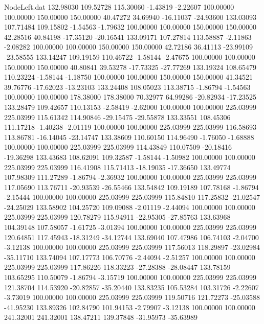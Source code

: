 \begin{filecontents}{NodeLeft.dat}
 132.98030  109.52728  115.30060    -1.43819   -2.22607  100.00000  100.00000  150.00000  150.00000   40.47272   34.69940  -16.11037  -24.93600
 133.03093  107.71484  109.15802    -1.54563   -1.79632  100.00000  100.00000  150.00000  150.00000   42.28516   40.84198  -17.35120  -20.16541
 133.09171  107.27814  113.58887    -2.11863   -2.08282  100.00000  100.00000  150.00000  150.00000   42.72186   36.41113  -23.99109  -23.58555
 133.14247  109.19159  110.46722    -1.58144   -2.47675  100.00000  100.00000  150.00000  150.00000   40.80841   39.53278  -17.73325  -27.77269
 133.19324  108.65479  110.23224    -1.58144   -1.18750  100.00000  100.00000  150.00000  150.00000   41.34521   39.76776  -17.62023  -13.23103
 133.24408  108.05023  113.38715    -1.86794   -1.54563  100.00000  100.00000  178.38000  178.38000   70.32977   64.99286  -20.82934  -17.23525
 133.28479  109.42657  110.13153    -2.58419   -2.62000  100.00000  100.00000  225.03999  225.03999  115.61342  114.90846  -29.15475  -29.55878
 133.33551  108.45306  111.17218    -1.40238   -2.01119  100.00000  100.00000  225.03999  225.03999  116.58693  113.86781  -16.14045  -23.14747
 133.38609  110.60150  114.96490    -1.76050   -1.68888  100.00000  100.00000  225.03999  225.03999  114.43849  110.07509  -20.18416  -19.36298
 133.43683  108.62091  109.32587    -1.58144   -1.50982  100.00000  100.00000  225.03999  225.03999  116.41908  115.71413  -18.19035  -17.36650
 133.49774  107.98309  111.27289    -1.86794   -2.36932  100.00000  100.00000  225.03999  225.03999  117.05690  113.76711  -20.93539  -26.55466
 133.54842  109.19189  107.78168    -1.86794   -2.15444  100.00000  100.00000  225.03999  225.03999  115.84810  117.25832  -21.02547  -24.25029
 133.58902  104.25720  109.09088    -2.01119   -2.44094  100.00000  100.00000  225.03999  225.03999  120.78279  115.94911  -22.95305  -27.85763
 133.63968  104.39148  107.58057    -1.61725   -3.01394  100.00000  100.00000  225.03999  225.03999  120.64851  117.45943  -18.31249  -34.12744
 133.69040  107.47986  106.74103    -2.04700   -3.12138  100.00000  100.00000  225.03999  225.03999  117.56013  118.29897  -23.02984  -35.11710
 133.74094  107.17773  106.70776    -2.44094   -2.51257  100.00000  100.00000  225.03999  225.03999  117.86226  118.33223  -27.28388  -28.08447
 133.78159  103.65295  110.50079    -1.86794   -3.15719  100.00000  100.00000  225.03999  225.03999  121.38704  114.53920  -20.82857  -35.20440
 133.83235  105.53284  103.31726    -2.22607   -3.73019  100.00000  100.00000  225.03999  225.03999  119.50716  121.72273  -25.03588  -41.95230
 133.89326  102.84790  101.94153    -2.79907   -3.12138  100.00000  100.00000  241.32001  241.32001  138.47211  139.37848  -31.95973  -35.63989

\end{filecontents}

